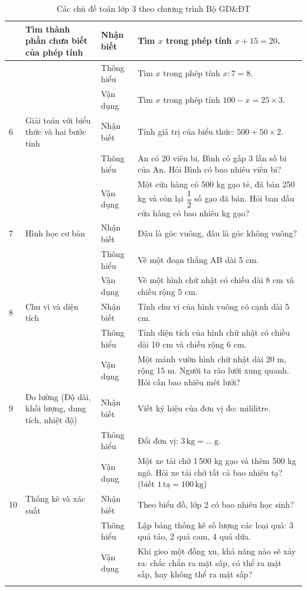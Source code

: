 \begin{longtable}{|>{\centering\arraybackslash}m{0.8cm}|m{3.5cm}|>{\centering\arraybackslash}m{2cm}|m{7.5cm}|}
	5 & Tìm thành phần chưa biết của phép tính
	& Nhận biết & Tìm $x$ trong phép tính $x + 15 = 20$. \\
	\cline{3-4}
	& & Thông hiểu & Tìm $x$ trong phép tính $x : 7 = 8$. \\
	\cline{3-4}
	& & Vận dụng & Tìm $x$ trong phép tính $100 - x = 25 \times 3$. \\
	\hline

	6 & Giải toán với biểu thức và hai bước tính
	& Nhận biết & Tính giá trị của biểu thức: $500 + 50 \times 2$. \\
	\cline{3-4}
	& & Thông hiểu & An có 20 viên bi, Bình có gấp 3 lần số bi của An. Hỏi Bình có bao nhiêu viên bi? \\
	\cline{3-4}
	& & Vận dụng & Một cửa hàng có 500 kg gạo tẻ, đã bán 250 kg và còn lại $\dfrac{1}{2}$ số gạo đã bán. Hỏi ban đầu cửa hàng có bao nhiêu kg gạo? \\
	\hline

	7 & Hình học cơ bản
	& Nhận biết & Đâu là góc vuông, đâu là góc không vuông? \\
	\cline{3-4}
	& & Thông hiểu & Vẽ một đoạn thẳng AB dài 5 cm. \\
	\cline{3-4}
	& & Vận dụng & Vẽ một hình chữ nhật có chiều dài 8 cm và chiều rộng 5 cm. \\
	\hline

	8 & Chu vi và diện tích
	& Nhận biết & Tính chu vi của hình vuông có cạnh dài 5 cm. \\
	\cline{3-4}
	& & Thông hiểu & Tính diện tích của hình chữ nhật có chiều dài 10 cm và chiều rộng 6 cm. \\
	\cline{3-4}
	& & Vận dụng & Một mảnh vườn hình chữ nhật dài 20 m, rộng 15 m. Người ta rào lưới xung quanh. Hỏi cần bao nhiêu mét lưới? \\
	\hline

	9 & Đo lường (Độ dài, khối lượng, dung tích, nhiệt độ)
	& Nhận biết & Viết ký hiệu của đơn vị đo: mililitre. \\
	\cline{3-4}
	& & Thông hiểu & Đổi đơn vị: $3\,\text{kg} = \ldots\,\text{g}$. \\
	\cline{3-4}
	& & Vận dụng & Một xe tải chở 1\,500 kg gạo và thêm 500 kg ngô. Hỏi xe tải chở tất cả bao nhiêu tạ? (biết $1\,\text{tạ} = 100\,\text{kg}$) \\
	\hline

	10 & Thống kê và xác suất
	& Nhận biết & Theo biểu đồ, lớp 2 có bao nhiêu học sinh? \\
	\cline{3-4}
	& & Thông hiểu & Lập bảng thống kê số lượng các loại quả: 3 quả táo, 2 quả cam, 4 quả dứa. \\
	\cline{3-4}
	& & Vận dụng & Khi gieo một đồng xu, khả năng nào sẽ xảy ra: chắc chắn ra mặt sấp, có thể ra mặt sấp, hay không thể ra mặt sấp? \\
	\hline

	\caption{Các chủ đề toán lớp 3 theo chương trình Bộ GD\&ĐT}
	\label{tab:toan-lop3}
\end{longtable}

